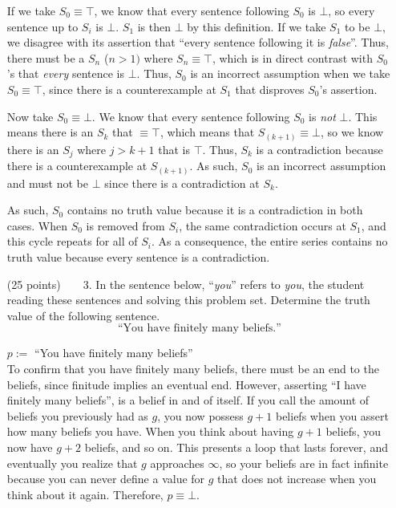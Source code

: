 \documentclass[11pt,a4paper]{article}
\begin{document}
\begin{enumerate}
         If we take $S_0 \equiv \top$, we know that every sentence following $S_0$ is $\bot$, so every sentence up to $S_i$ is $\bot$. $S_1$ is then $\bot$ by this definition. If we take $S_1$ to be $\bot$, we disagree with its assertion that ``every sentence following it is \emph{false}''. Thus, there must be a $S_n$ ($n > 1)$ where $S_n \equiv \top$, which is in direct contrast with $S_0$'s that \emph{every} sentence is $\bot$. Thus, $S_0$ is an incorrect assumption when we take $S_0 \equiv \top$, since there is a counterexample at $S_1$ that disproves $S_0$'s assertion.
         
         Now take $S_0 \equiv \bot$. We know that every sentence following $S_0$ is \emph{not} $\bot$. This means there is an $S_k$ that $\equiv \top$, which means that $S_(k+1) \equiv \bot$, so we know there is an $S_j$ where $j > k + 1$ that is $\top$. Thus, $S_k$ is a contradiction because there is a counterexample at $S_(k+1)$. As such, $S_0$ is an incorrect assumption and must not be $\bot$ since there is a contradiction at $S_k$. 

         As such, $S_0$ contains no truth value because it is a contradiction in both cases. When $S_0$ is removed from $S_i$, the same contradiction occurs at $S_1$, and this cycle repeats for all of $S_i$. As a consequence, the entire series contains no truth value because every sentence is a contradiction. 
    \item[(25 points)~~~~3.]
        In the sentence below, ``\emph{you}'' refers to \emph{you}, the student reading these sentences and solving this problem set. Determine the truth value of the following sentence.
        \begin{equation}
            \text{``You have finitely many beliefs.''}
        \end{equation}

        $p := $ ``You have finitely many beliefs''  \\ 
        To confirm that you have finitely many beliefs, there must be an end to the beliefs, since finitude implies an eventual end. However, asserting ``I have finitely many beliefs'', is a belief in and of itself. If you call the amount of beliefs you previously had as $g$, you now possess $g + 1$ beliefs when you assert how many beliefs you have. When you think about having $g + 1$ beliefs, you now have $g + 2$ beliefs, and so on. This presents a loop that lasts forever, and eventually you realize that $g$ approaches $\infty$, so your beliefs are in fact infinite because you can never define a value for $g$ that does not increase when you think about it again. Therefore, $p \equiv \bot$.
\end{enumerate}
\end{document}
